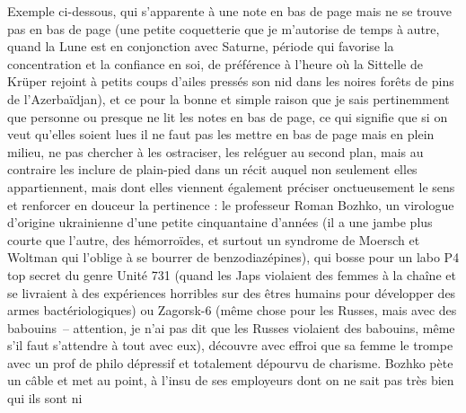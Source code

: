 %
Exemple ci-dessous, qui s’apparente à une note en bas de page mais ne se trouve pas en bas de page (une petite coquetterie que je m’autorise de temps à autre, quand la Lune est en conjonction avec Saturne, période qui favorise la concentration et la confiance en soi, de préférence à l’heure où la Sittelle de Krüper rejoint à petits coups d’ailes pressés son nid dans les noires forêts de pins de l’Azerbaïdjan), et ce pour la bonne et simple raison que je sais pertinemment que personne ou presque ne lit les notes en bas de page, ce qui signifie que si on veut qu’elles soient lues il ne faut pas les mettre en bas de page mais en plein milieu, ne pas chercher à les ostraciser, les reléguer au second plan, mais au contraire les inclure de plain-pied dans un récit auquel non seulement elles appartiennent, mais dont elles viennent également préciser onctueusement le sens et renforcer en douceur la pertinence : le professeur Roman Bozhko, un virologue d’origine ukrainienne d’une petite cinquantaine d’années (il a une jambe plus courte que l’autre, des hémorroïdes, et surtout un syndrome de Moersch et Woltman qui l’oblige à se bourrer de benzodiazépines), qui bosse pour un labo P4 top secret du genre Unité 731 (quand les Japs violaient des femmes à la chaîne et se livraient à des expériences horribles sur des êtres humains pour développer des armes bactériologiques) ou Zagorsk-6 (même chose pour les Russes, mais avec des babouins~-- attention, je n’ai pas dit que les Russes violaient des babouins, même s’il faut s’attendre à tout avec eux), découvre avec effroi que sa femme le trompe avec un prof de philo dépressif et totalement dépourvu de charisme. Bozhko pète un câble et met au point, à l’insu de ses employeurs dont on ne sait pas très bien qui ils sont ni 